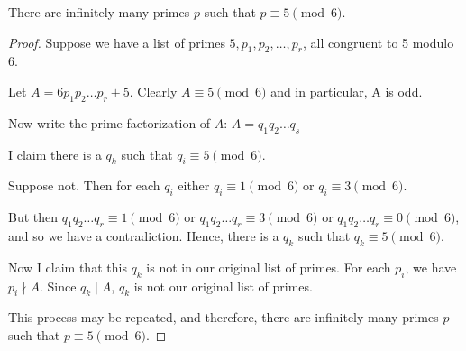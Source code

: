 \begin{prop}
    There are infinitely many primes $p$ such that $p \equiv 5 \pmod{6}$.
\end{prop}
\begin{proof}


Suppose we have a list of primes $5, p_1, p_2, \ldots, p_r$, all congruent to 5 modulo 6.

Let $A = 6 p_1 p_2 \ldots p_r + 5$. Clearly $A \equiv 5 \pmod{6}$ and in particular, A is odd.

Now write the prime factorization of $A$: $A = q_1 q_2 \ldots q_s$

I claim there is a $q_k$ such that $q_i \equiv 5 \pmod{6}$. 

Suppose not. Then for each $q_i$ either $q_i \equiv 1 \pmod{6}$ or $q_i \equiv 3 \pmod{6}$. 

But then $q_1 q_2 \ldots q_r \equiv 1 \pmod{6}$ or $q_1 q_2 \ldots q_r \equiv 3 \pmod{6}$ or $q_1 q_2 \ldots q_r \equiv 0 \pmod{6}$, and so we have a contradiction. Hence, there is a $q_k$ such that $q_k \equiv 5 \pmod{6}$.

Now I claim that this $q_k$ is not in our original list of primes. For each $p_i$, we have $p_i \nmid A$. Since $q_k \mid A$, $q_k$ is not our original list of primes.

This process may be repeated, and therefore, there are infinitely many primes $p$ such that $p \equiv 5 \pmod{6}$.
\end{proof}
